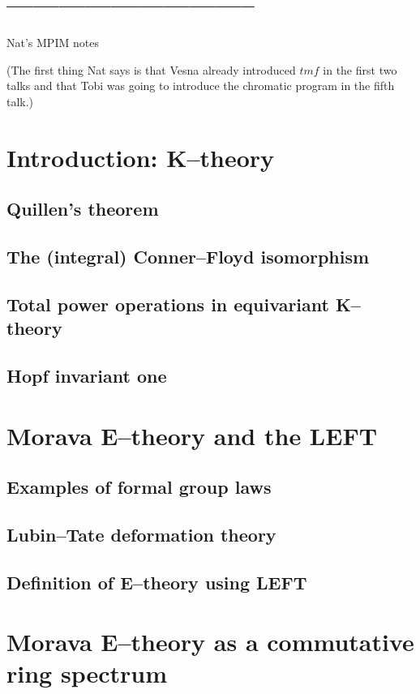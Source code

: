 \newpage
\section*{-----------------------------}

Nat's MPIM notes

(The first thing Nat says is that Vesna already introduced $tmf$ in the first two talks and that Tobi was going to introduce the chromatic program in the fifth talk.)

\section*{Introduction: K--theory}
    \subsection*{Quillen's theorem}
    \subsection*{The (integral) Conner--Floyd isomorphism}
    \subsection*{Total power operations in equivariant K--theory}
    \subsection*{Hopf invariant one}

\section*{Morava E--theory and the LEFT}
    \subsection*{Examples of formal group laws}
    \subsection*{Lubin--Tate deformation theory}
    \subsection*{Definition of E--theory using LEFT}

\section*{Morava E--theory as a commutative ring spectrum}
